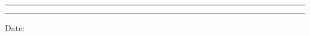 \begin{center}
    \myheader
    \end{center}
    \hrule \vspace*{2pt} \hrule  \vspace*{20pt}
    \begin{adjustwidth}{15mm}{15mm}\large
        \begin{flushright} 
            Date: \underline{\datecontainer}
        \end{flushright}\large\vspace{1cm} 
        
        
        
        \vspace{2ex}
        \begin{flushright}\Large
            
        \end{flushright}
    \end{adjustwidth}